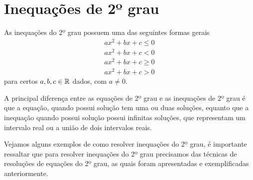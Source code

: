  \section{Inequações de 2º grau}
 
 \vskip0.3cm
 \colorbox{azul}{
 \begin{minipage}{0.9\linewidth}
 \begin{center}
  As inequações do 2º grau possuem uma das seguintes formas gerais
 \begin{eqnarray*}
 ax^2 + bx + c \leq 0 \\
 ax^2 + bx + c < 0 \\
 ax^2 + bx + c \geq 0 \\
 ax^2 + bx + c >0 
 \end{eqnarray*}  
 para certos $a, b, c \in \mathbb{R}$ dados, com $a \neq 0$.
 \end{center}
 \end{minipage}}
 \vskip0.3cm
  
 A principal diferença entre as equações de 2º grau e as inequações de 2º grau é que a equação, quando possui solução tem uma ou duas soluções, equanto que a inequação quando possui solução possui infinitas soluções, que representam um intervalo real ou a união de dois intervalos reais. 
 
 Vejamos alguns exemplos de como resolver inequações do 2º grau, é importante ressaltar que para resolver inequações do 2º grau precisamos das técnicas de resoluções de equações do 2º grau, as quais foram apresentadas e exemplificadas anteriormente.
 

